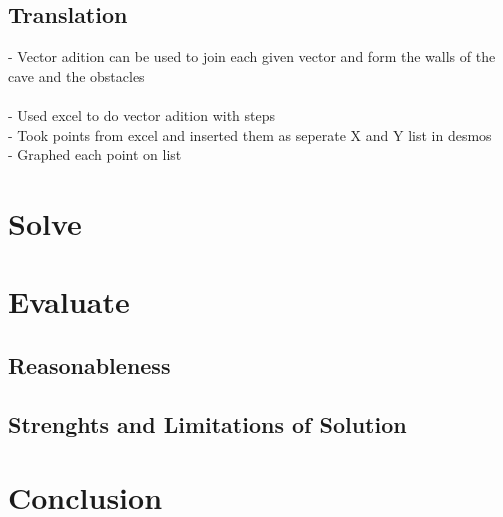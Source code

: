 \documentclass[11pt, letterpaper]{article}
\begin{document}
\subsection{Translation}
\par 
- Vector adition can be used to join each given vector and form the walls of the cave and the obstacles
\\
\\
- Used excel to do vector adition with steps
\\ 
- Took points from excel and inserted them as seperate X and Y list in desmos
\\
- Graphed each point on list

\par 


\section{Solve}

\par 


\section{Evaluate}



\subsection{Reasonableness}


\subsection{Strenghts and Limitations of Solution}


\section{Conclusion}


 
\end{document}
